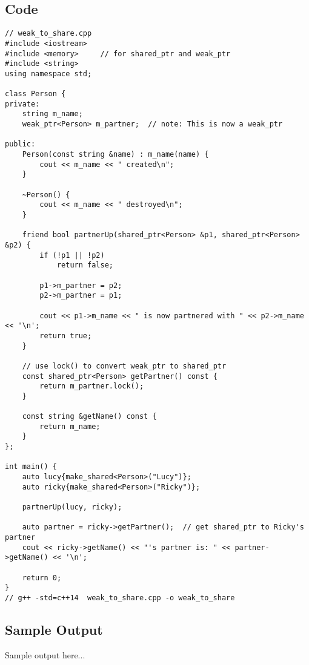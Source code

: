 \documentclass[12pt]{article}
\begin{document}
\subsection*{Code}
\begin{Verbatim}[fontsize=\small,frame=single]
// weak_to_share.cpp
#include <iostream>
#include <memory>     // for shared_ptr and weak_ptr
#include <string>
using namespace std;

class Person {
private:
    string m_name;
    weak_ptr<Person> m_partner;  // note: This is now a weak_ptr

public:
    Person(const string &name) : m_name(name) {
        cout << m_name << " created\n";
    }

    ~Person() {
        cout << m_name << " destroyed\n";
    }

    friend bool partnerUp(shared_ptr<Person> &p1, shared_ptr<Person> &p2) {
        if (!p1 || !p2)
            return false;

        p1->m_partner = p2;
        p2->m_partner = p1;

        cout << p1->m_name << " is now partnered with " << p2->m_name << '\n';
        return true;
    }

    // use lock() to convert weak_ptr to shared_ptr
    const shared_ptr<Person> getPartner() const {
        return m_partner.lock();
    }

    const string &getName() const {
        return m_name;
    }
};

int main() {
    auto lucy{make_shared<Person>("Lucy")};
    auto ricky{make_shared<Person>("Ricky")};

    partnerUp(lucy, ricky);

    auto partner = ricky->getPartner();  // get shared_ptr to Ricky's partner
    cout << ricky->getName() << "'s partner is: " << partner->getName() << '\n';

    return 0;
}
// g++ -std=c++14  weak_to_share.cpp -o weak_to_share
\end{Verbatim}

\subsection*{Sample Output}
\begin{tcolorbox}[colback=black!5!white,colframe=black!75!white]
Sample output here...
\end{tcolorbox}
\newpage
\end{document}
